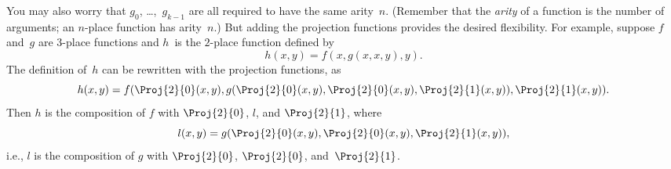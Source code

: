 \documentclass[../../../include/open-logic-section]{subfiles}
\begin{document}
You may also worry that $g_0$, \dots,~$g_{k-1}$ are all required
to have the same arity~$n$. (Remember that the \emph{arity} of a
function is the number of arguments; an $n$-place function has
arity~$n$.) But adding the projection functions provides the desired
flexibility. For example, suppose $f$ and~$g$ are $3$-place functions
and $h$~is the $2$-place function defined by
\[
h(x,y) = f(x,g(x,x,y),y).
\]
The definition of~$h$ can be rewritten with the projection
functions, as
\[
h(x,y) = f(\Proj{2}{0}(x,y), g(\Proj{2}{0}(x,y), \Proj{2}{0}(x,y),
\Proj{2}{1}(x,y)), \Proj{2}{1}(x,y)).
\]
Then $h$ is the composition of $f$ with $\Proj{2}{0}$, $l$, and
$\Proj{2}{1}$, where
\[
l(x,y) = g(\Proj{2}{0}(x,y),\Proj{2}{0}(x,y),\Proj{2}{1}(x,y)),
\]
i.e., $l$ is the composition of $g$ with $\Proj{2}{0}$, $\Proj{2}{0}$,
and~$\Proj{2}{1}$.
\end{document}
